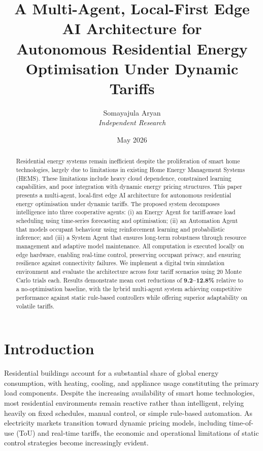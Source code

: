 \documentclass[11pt,a4paper]{article}
\title{\textbf{A Multi-Agent, Local-First Edge AI Architecture for\\
Autonomous Residential Energy Optimisation Under Dynamic Tariffs}}
\author{Somayajula Aryan\\
\textit{Independent Research}}
\date{May 2026}
\begin{document}
\maketitle

\begin{abstract}
Residential energy systems remain inefficient despite the proliferation of smart home technologies, largely due to limitations in existing Home Energy Management Systems (HEMS). These limitations include heavy cloud dependence, constrained learning capabilities, and poor integration with dynamic energy pricing structures. This paper presents a multi-agent, local-first edge AI architecture for autonomous residential energy optimisation under dynamic tariffs. The proposed system decomposes intelligence into three cooperative agents: (i) an Energy Agent for tariff-aware load scheduling using time-series forecasting and optimisation; (ii) an Automation Agent that models occupant behaviour using reinforcement learning and probabilistic inference; and (iii) a System Agent that ensures long-term robustness through resource management and adaptive model maintenance. All computation is executed locally on edge hardware, enabling real-time control, preserving occupant privacy, and ensuring resilience against connectivity failures. We implement a digital twin simulation environment and evaluate the architecture across four tariff scenarios using 20 Monte Carlo trials each. Results demonstrate mean cost reductions of \textbf{9.2--12.8\%} relative to a no-optimisation baseline, with the hybrid multi-agent system achieving competitive performance against static rule-based controllers while offering superior adaptability on volatile tariffs.
\end{abstract}

\section{Introduction}
\label{sec:intro}

Residential buildings account for a substantial share of global energy consumption, with heating, cooling, and appliance usage constituting the primary load components. Despite the increasing availability of smart home technologies, most residential environments remain reactive rather than intelligent, relying heavily on fixed schedules, manual control, or simple rule-based automation. As electricity markets transition toward dynamic pricing models, including time-of-use (ToU) and real-time tariffs, the economic and operational limitations of static control strategies become increasingly evident.
\end{document}
